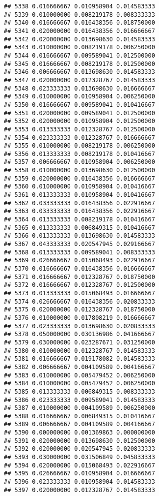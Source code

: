 \documentclass[
]{article}
\begin{document}
\begin{verbatim}
## 5338 0.016666667 0.010958904 0.014583333
## 5339 0.010000000 0.008219178 0.008333333
## 5340 0.016666667 0.016438356 0.018750000
## 5341 0.020000000 0.016438356 0.016666667
## 5342 0.020000000 0.013698630 0.014583333
## 5343 0.010000000 0.008219178 0.006250000
## 5344 0.016666667 0.009589041 0.012500000
## 5345 0.016666667 0.008219178 0.012500000
## 5346 0.006666667 0.013698630 0.014583333
## 5347 0.020000000 0.012328767 0.014583333
## 5348 0.023333333 0.013698630 0.016666667
## 5349 0.010000000 0.010958904 0.006250000
## 5350 0.016666667 0.009589041 0.010416667
## 5351 0.020000000 0.009589041 0.012500000
## 5352 0.020000000 0.010958904 0.012500000
## 5353 0.013333333 0.012328767 0.012500000
## 5354 0.023333333 0.012328767 0.016666667
## 5355 0.010000000 0.008219178 0.006250000
## 5356 0.013333333 0.008219178 0.010416667
## 5357 0.006666667 0.010958904 0.006250000
## 5358 0.010000000 0.013698630 0.012500000
## 5359 0.020000000 0.016438356 0.016666667
## 5360 0.010000000 0.010958904 0.010416667
## 5361 0.013333333 0.010958904 0.010416667
## 5362 0.033333333 0.016438356 0.022916667
## 5363 0.033333333 0.016438356 0.022916667
## 5364 0.013333333 0.008219178 0.010416667
## 5365 0.013333333 0.006849315 0.010416667
## 5366 0.013333333 0.013698630 0.014583333
## 5367 0.043333333 0.020547945 0.029166667
## 5368 0.013333333 0.009589041 0.008333333
## 5369 0.026666667 0.015068493 0.022916667
## 5370 0.016666667 0.016438356 0.016666667
## 5371 0.016666667 0.012328767 0.018750000
## 5372 0.016666667 0.012328767 0.012500000
## 5373 0.013333333 0.015068493 0.016666667
## 5374 0.026666667 0.016438356 0.020833333
## 5375 0.020000000 0.012328767 0.018750000
## 5376 0.010000000 0.017808219 0.016666667
## 5377 0.023333333 0.013698630 0.020833333
## 5378 0.050000000 0.030136986 0.041666667
## 5379 0.030000000 0.023287671 0.031250000
## 5380 0.010000000 0.012328767 0.014583333
## 5381 0.016666667 0.019178082 0.014583333
## 5382 0.006666667 0.004109589 0.004166667
## 5383 0.010000000 0.005479452 0.006250000
## 5384 0.010000000 0.005479452 0.006250000
## 5385 0.013333333 0.006849315 0.008333333
## 5386 0.023333333 0.009589041 0.014583333
## 5387 0.010000000 0.004109589 0.006250000
## 5388 0.016666667 0.006849315 0.010416667
## 5389 0.006666667 0.004109589 0.004166667
## 5390 0.000000000 0.001369863 0.000000000
## 5391 0.020000000 0.013698630 0.012500000
## 5392 0.020000000 0.020547945 0.020833333
## 5393 0.030000000 0.031506849 0.045833333
## 5394 0.020000000 0.015068493 0.022916667
## 5395 0.026666667 0.010958904 0.016666667
## 5396 0.023333333 0.010958904 0.014583333
## 5397 0.020000000 0.012328767 0.014583333

\end{verbatim}
\end{document}
